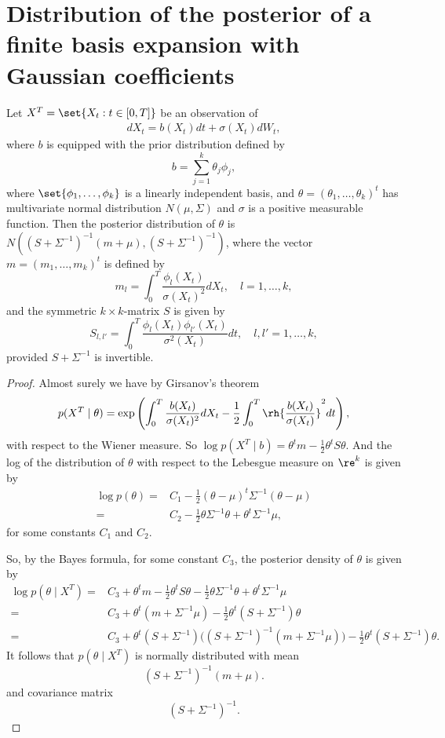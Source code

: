 \documentclass[12pt]{article}
\begin{document}
\section{Distribution of the posterior of a finite basis expansion with Gaussian coefficients}

\begin{lemma}
	Let \(X^T=\set{X_t:t\in[0,T]}\) be an observation of 
	\begin{align*}
		dX_t=b(X_t)dt+\sigma(X_t)dW_t,
	\end{align*}
	where \(b\) is equipped with the prior distribution defined by 
	\[
	b=\sum_{j=1}^k\theta_j\phi_j,
	\]
	where \(\set{\phi_1,\ldots,\phi_k}\) is a linearly independent basis, and \(\theta=(\theta_1,\ldots,\theta_k)^t\) has multivariate normal distribution \(N(\mu,\Sigma)\) and \(\sigma\) is a positive measurable function. Then the  posterior distribution of \(\theta\) is \(N((S+\Sigma^{-1})^{-1}(m+\mu), (S+\Sigma^{-1})^{-1})\), where the vector \(m=(m_1,\ldots,m_k)^t\) is defined by 
	\[
	m_l=\int_0^T\frac{\phi_l(X_t)}{\sigma(X_t)^2}dX_t, \quad l=1,\ldots,k,
	\] 
	and the symmetric \(k\times k\)-matrix \(S\) is given by 
	\[
	S_{l,l'}=\int_0^T\frac{\phi_l(X_t)\phi_{l'}(X_t)}{\sigma^2(X_t)}dt,\quad l,l'=1,\ldots,k,
	\]
	provided \(S+\Sigma^{-1}\) is invertible. 
\end{lemma}
\begin{proof}Almost surely we have by Girsanov's theorem\begin{equation}\label{eq:girsanov}
p(X^T\mid \theta)=\exp\left(\int_0^T\frac{b(X_t)}{\sigma(X_t)^2}dX_t-\frac12\int_0^T\rh{\frac{b(X_t)}{\sigma(X_t)}}^2dt\right),
\end{equation}with respect to the Wiener measure. So \(\log p(X^T\mid b)=\theta^tm - \frac 1 2 \theta^t S\theta\). And the log of the distribution of \(\theta\) with respect to the Lebesgue measure on \(\re^k\) is given by
\begin{align*}
	\log p(\theta)= &C_1 - \frac 1 2 (\theta-\mu)^t\Sigma^{-1}(\theta-\mu) \\
	= &C_2 - \frac 1 2 \theta\Sigma^{-1}\theta +\theta^t\Sigma^{-1}\mu,
\end{align*}
for some constants \(C_1\) and \(C_2\). 

So, by the Bayes formula, for some constant \(C_3\), the posterior density of \(\theta\) is given by\begin{align*}
	\log p(\theta\mid X^T) = & C_3 + \theta^tm - \frac 1 2 \theta^t S\theta - \frac 1 2 \theta\Sigma^{-1}\theta +\theta^t\Sigma^{-1}\mu\\
	= & C_3 + \theta^t ( m + \Sigma^{-1} \mu ) - \frac 1 2 \theta^t (S+\Sigma^{-1}) \theta\\
	= & C_3 + \theta^t ( S + \Sigma^{-1} )  \Big  ( ( S + \Sigma^{-1} )^{-1} (m + \Sigma^{-1}\mu )\Big) - \frac 1 2 \theta^t (S+\Sigma^{-1}) \theta. 
\end{align*}It follows that  \(p(\theta\mid X^T)\) is normally distributed with mean 
\[( S + \Sigma^{-1} )^{-1} (m + \mu).\]
 and covariance matrix \[(S+\Sigma^{-1})^{-1}.\]
\end{proof}
\end{document}
